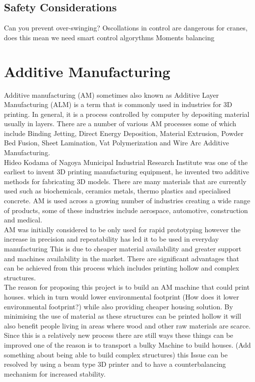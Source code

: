 \documentclass{UoNMCHA}
\numberwithin{equation}{section}
\begin{document}
\subsection{Safety Considerations} \label{Safety Considerations}

Can you prevent over-swinging? Oscollations in control are dangerous for cranes, does this mean we need smart control algorythms
Moments balancing 

\section{Additive Manufacturing}\label{Additive Manufacturing}

Additive manufacturing (AM) sometimes also known as Additive Layer Manufacturing (ALM) is a term that is commonly used in industries for 3D printing. In general, it is a process controlled by computer by depositing material usually in layers. There are a number of various AM processes some of which include Binding Jetting, Direct Energy Deposition, Material Extrusion, Powder Bed Fusion, Sheet Lamination, Vat Polymerization and Wire Arc Additive Manufacturing. \\

Hideo Kodama of Nagoya Municipal Industrial Research Institute was one of the earliest to invent 3D printing manufacturing equipment, he invented two additive methods for fabricating 3D models. There are many materials that are currently used such as biochemicals, ceramics metals, thermo plastics and specialised concrete. AM is used across a growing number of industries creating a wide range of products, some of these industries include aerospace, automotive, construction and medical. \\

AM was initially considered to be only used for rapid prototyping however the increase in precision and repeatability has led it to be used in everyday manufacturing This is due to cheaper material availability and greater support and machines availability in the market. There are significant advantages that can be achieved from this process which includes printing hollow and complex structures. \\

The reason for proposing this project is to build an AM machine that could print houses. which in turn would lower environmental footprint (How does it lower environmental footprint?) while also providing cheaper housing solution.  By minimising the use of material as these structures can be printed hollow it will also benefit people living in areas where wood and other raw materials are scarce. Since this is a relatively new process there are still ways these things can be improved one of the reason is to transport a bulky Machine to build houses. (Add something about being able to build complex structures) this Issue can be resolved by using a beam type 3D printer and to have a counterbalancing mechanism for increased stability. \\
\end{document}
